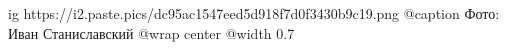  
 
 
 
 

\ifcmt
  ig https://i2.paste.pics/dc95ac1547eed5d918f7d0f3430b9c19.png
	@caption Фото: Иван Станиславский
  @wrap center
  @width 0.7
\fi
